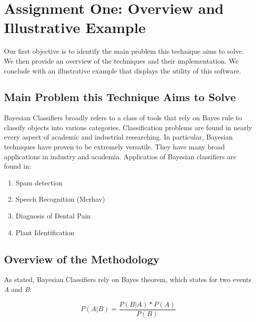 

\graphicspath{{C:/Documents and Settings/amcelhinney/My Documents/GitHub/MCS507HW/MCS 507 Homework 4/MCS507--Project-3/tex/include/}}

\section{Assignment One: Overview and Illustrative Example} %
\label{sec: Main Problem}
Our first objective is to identify the main problem this technique aims to solve. We then provide an overview of the techniques and their implementation. We conclude with an illustrative example that displays the utility of this software.

\subsection{Main Problem this Technique Aims to Solve} %
\label{sub:methoda}
Bayesian Classifiers broadly refers to a class of tools that rely on Bayes rule to classify objects into various categories. Classification problems are found in nearly every aspect of academic and industrial researching. In particular, Bayesian techniques have proven to be extremely versatile. They have many broad applications in industry and academia. Applicatios of Bayesian classifiers are found in:

\begin{enumerate}
\item Spam detection
\item Speech Recognition (Merhav)
\item Diagnosis of Dental Pain
\item Plant Identification
\end{enumerate}


\subsection{Overview of the Methodology} %

As stated, Bayesian Classifiers rely on  Bayes theorem, which states for two events \emph{A} and \emph{B}:

\begin{equation}
P(A|B)=\frac{P(B|A)*P(A)}{P(B)}
\end{equation}

